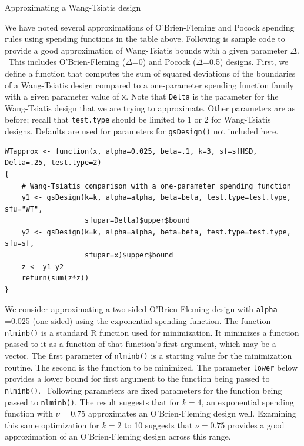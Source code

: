 \begin{example}
Approximating a Wang-Tsiatis design
\end{example}

We have noted several approximations of O'Brien-Fleming and Pocock spending
rules using spending functions in the table above. Following is sample code to
provide a good approximation of Wang-Tsiatis bounds with a given parameter
$\Delta$. \ This includes O'Brien-Fleming ($\Delta$=0) and Pocock ($\Delta
$=0.5) designs. First, we define a function that computes the sum of squared
deviations of the boundaries of a Wang-Tsiatis design compared to a
one-parameter spending function family with a given parameter value of
\texttt{x}. Note that \texttt{Delta} is the parameter for the Wang-Tsiatis
design that we are trying to approximate. Other parameters are as before;
recall that \texttt{test.type} should be limited to 1 or 2 for Wang-Tsiatis
designs. Defaults are used for parameters for \texttt{gsDesign()} not included here.

\bigskip

\begin{verbatim}
WTapprox <- function(x, alpha=0.025, beta=.1, k=3, sf=sfHSD, Delta=.25, test.type=2)
{
    # Wang-Tsiatis comparison with a one-parameter spending function
    y1 <- gsDesign(k=k, alpha=alpha, beta=beta, test.type=test.type, sfu="WT",
                   sfupar=Delta)$upper$bound
    y2 <- gsDesign(k=k, alpha=alpha, beta=beta, test.type=test.type, sfu=sf,
                   sfupar=x)$upper$bound
    z <- y1-y2
    return(sum(z*z))
}
\end{verbatim}
\bigskip

We consider approximating a two-sided O'Brien-Fleming design with \texttt{alpha}%
=0.025 (one-sided) using the exponential spending function. The function
\texttt{nlminb()} is a standard R function used for minimization. It minimizes
a function passed to it as a function of that function's first 
argument, which may be a vector. The first parameter of \texttt{nlminb()} is 
a starting value for the minimization routine. The second is the function to be
minimized. The parameter \texttt{lower} below provides a lower bound for first
argument to the function being passed to \texttt{nlminb()}. \ Following
parameters are fixed parameters for the function being passed to
\texttt{nlminb()}. The result suggests that for $k=4$, an exponential spending
function with $\nu=0.75$ approximates an O'Brien-Fleming design well.
Examining this same optimization for $k=2$ to 10 suggests that $\nu=0.75$
provides a good approximation of an O'Brien-Fleming design across this range.

